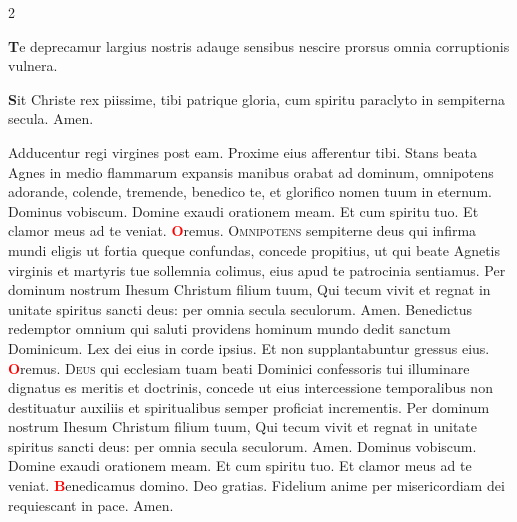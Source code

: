 \begin{multicols}{2}
{\par {\bfseries \color{Blue} T}e deprecamur largius
nostris adauge sensibus
nescire prorsus omnia
corruptionis vulnera.
\par {\bfseries \color{Red} S}it Christe rex piissime,
tibi patrique gloria,
cum spiritu paraclyto
in sempiterna secula. Amen.
}
\newline \V Adducentur regi virgines post eam. \R Proxime eius afferentur tibi.
\newline {} Stans beata Agnes in medio flammarum expansis manibus orabat ad dominum, omnipotens adorande, colende, tremende, benedico te, et glorifico nomen tuum in eternum.
 Dominus vobiscum.  Domine exaudi orationem meam.
\newline \R Et cum spiritu tuo.  Et clamor meus ad te veniat.
\newline \textcolor{Red}{\bfseries O}remus. 
\lettrine[lines=2]{\zallmancaps \color{Red} O}{mnipotens} sempiterne deus qui infirma mundi eligis ut fortia queque confundas, concede propitius, ut qui beate Agnetis virginis et martyris tue sollemnia colimus, eius apud te patrocinia sentiamus. Per dominum nostrum Ihesum Christum filium tuum, Qui tecum vivit et regnat in unitate spiritus sancti deus: per omnia secula seculorum. \R Amen.
\newline {}
\newline {} Benedictus redemptor omnium qui saluti providens hominum mundo dedit sanctum Dominicum.
\newline \V Lex dei eius in corde ipsius. \R Et non supplantabuntur gressus eius.
\newline \textcolor{Red}{\bfseries O}remus. 
\lettrine[lines=2]{\zallmancaps \color{Blue} D}{eus} qui ecclesiam tuam beati Dominici confessoris tui illuminare dignatus es meritis et doctrinis, concede ut eius intercessione temporalibus non destituatur auxiliis et spiritualibus semper proficiat incrementis. Per dominum nostrum Ihesum Christum filium tuum, Qui tecum vivit et regnat in unitate spiritus sancti deus: per omnia secula seculorum. \R Amen.
 Dominus vobiscum.  Domine exaudi orationem meam.
\newline \R Et cum spiritu tuo.  Et clamor meus ad te veniat.
\newline \textcolor{Red}{\bfseries B}enedicamus domino. \R Deo gratias.
\newline {}
\newline Fidelium anime per misericordiam dei requiescant in pace. \R Amen.
\newline {}



\end{multicols}

